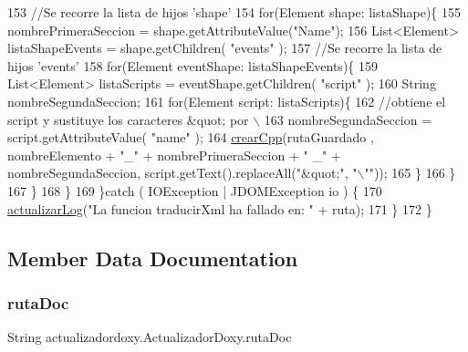 \begin{DoxyCode}
153                 \textcolor{comment}{//Se recorre la lista de hijos 'shape'}
154                 \textcolor{keywordflow}{for}(Element shape: listaShape)\{
155                     nombrePrimeraSeccion = shape.getAttributeValue(\textcolor{stringliteral}{"Name"});
156                     List<Element> listaShapeEvents = shape.getChildren( \textcolor{stringliteral}{"events"} );
157                     \textcolor{comment}{//Se recorre la lista de hijos 'events'}
158                     \textcolor{keywordflow}{for}(Element eventShape: listaShapeEvents)\{
159                         List<Element> listaScripts = eventShape.getChildren( \textcolor{stringliteral}{"script"} );
160                         String nombreSegundaSeccion;
161                         \textcolor{keywordflow}{for}(Element script: listaScripts)\{
162                             \textcolor{comment}{//obtiene el script y sustituye los caracteres &quot; por \(\backslash\)}
163 \textcolor{comment}{                            nombreSegundaSeccion = script.getAttributeValue( "name" );}
164                             \mbox{\hyperlink{classactualizadordoxy_1_1_actualizador_doxy_aebb9505e0384909ac6e2e677f400eaec}{crearCpp}}(rutaGuardado , nombreElemento + \textcolor{stringliteral}{"\_"} + nombrePrimeraSeccion + \textcolor{stringliteral}{"
      \_"} + nombreSegundaSeccion, script.getText().replaceAll(\textcolor{stringliteral}{"&quot;"}, \textcolor{stringliteral}{"\(\backslash\)""}));
165                         \}
166                     \}
167                 \}
168             \}
169         \}\textcolor{keywordflow}{catch} ( IOException | JDOMException io ) \{
170             \mbox{\hyperlink{classactualizadordoxy_1_1_actualizador_doxy_a1ad41046efbaaf40a60b34da347f9090}{actualizarLog}}(\textcolor{stringliteral}{"La funcion traducirXml ha fallado en: "} + ruta);
171         \}
172     \}
\end{DoxyCode}


\subsection{Member Data Documentation}
\mbox{\label{classactualizadordoxy_1_1_actualizador_doxy_a5655cc699bfc4a0b01432170892663d8}} 
\subsubsection{\texorpdfstring{ruta\+Doc}{rutaDoc}}
{\footnotesize\ttfamily String actualizadordoxy.\+Actualizador\+Doxy.\+ruta\+Doc\hspace{0.3cm}{\ttfamily [private]}}

